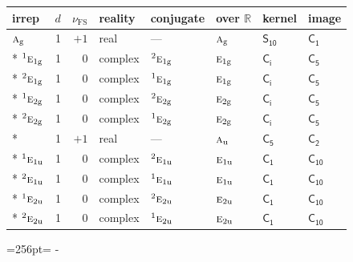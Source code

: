 \documentclass[10pt,a4paper]{article}
\newcommand{\needspace}[1]{\par\penalty-100\begingroup\dimen0=#1\relax\dimen2=\pagegoal
  \advance\dimen2-\pagetotal\ifdim\dimen0>\dimen2\relax\ifdim\dimen2>0pt\vfil\break\fi\fi
  \endgroup}
\numberwithin{equation}{section}
\newcommand{\grp}[1]{\mathsf{#1}}
\newcommand{\irr}[1]{\text{\normalfont\scshape #1}}
\newcommand{\conjpair}[1]{{}^{#1}}
\newcommand{\detbox}[1]{{\setlength{\fboxsep}{1pt}\fbox{#1}}}
\newcommand{\ptag}[1]{\mathrm{#1}}
\newcommand{\fsind}{\nu_{\mathrm{FS}}}
\begin{document}
{\small\renewcommand{\arraystretch}{1.25}\setlength{\tabcolsep}{4pt}\begin{longtable}{@{}lrrlllll@{}}\toprule
irrep & $d$ & $\fsind$ & reality & conjugate & over $\mathbb{R}$ & kernel & image\\\midrule\endhead
\bottomrule\endfoot\endlastfoot
$\irr{a}_{\ptag{g}}$ & 1 & $+1$ & real & --- & $\irr{a}_{\ptag{g}}$ & \href{S10.pdf}{$\grp{S_{10}}$} & \href{../../../rotation/data/pdf/C1.pdf}{$\grp{C_{1}}$}\\*
$\conjpair{1}\irr{e}_{1\ptag{g}}$ & 1 & $0$ & complex & $\conjpair{2}\irr{e}_{1\ptag{g}}$ & $\irr{e}_{1\ptag{g}}$ & \href{S2.pdf}{$\grp{C_{i}}$} & \href{../../../rotation/data/pdf/C5.pdf}{$\grp{C_{5}}$}\\*
$\conjpair{2}\irr{e}_{1\ptag{g}}$ & 1 & $0$ & complex & $\conjpair{1}\irr{e}_{1\ptag{g}}$ & $\irr{e}_{1\ptag{g}}$ & \href{S2.pdf}{$\grp{C_{i}}$} & \href{../../../rotation/data/pdf/C5.pdf}{$\grp{C_{5}}$}\\*
$\conjpair{1}\irr{e}_{2\ptag{g}}$ & 1 & $0$ & complex & $\conjpair{2}\irr{e}_{2\ptag{g}}$ & $\irr{e}_{2\ptag{g}}$ & \href{S2.pdf}{$\grp{C_{i}}$} & \href{../../../rotation/data/pdf/C5.pdf}{$\grp{C_{5}}$}\\*
$\conjpair{2}\irr{e}_{2\ptag{g}}$ & 1 & $0$ & complex & $\conjpair{1}\irr{e}_{2\ptag{g}}$ & $\irr{e}_{2\ptag{g}}$ & \href{S2.pdf}{$\grp{C_{i}}$} & \href{../../../rotation/data/pdf/C5.pdf}{$\grp{C_{5}}$}\\*
\detbox{$\irr{a}_{\ptag{u}}$} & 1 & $+1$ & real & --- & $\irr{a}_{\ptag{u}}$ & \href{C5.pdf}{$\grp{C_{5}}$} & \href{../../../rotation/data/pdf/C2.pdf}{$\grp{C_{2}}$}\\*
$\conjpair{1}\irr{e}_{1\ptag{u}}$ & 1 & $0$ & complex & $\conjpair{2}\irr{e}_{1\ptag{u}}$ & $\irr{e}_{1\ptag{u}}$ & \href{C1.pdf}{$\grp{C_{1}}$} & \href{../../../rotation/data/pdf/C10.pdf}{$\grp{C_{10}}$}\\*
$\conjpair{2}\irr{e}_{1\ptag{u}}$ & 1 & $0$ & complex & $\conjpair{1}\irr{e}_{1\ptag{u}}$ & $\irr{e}_{1\ptag{u}}$ & \href{C1.pdf}{$\grp{C_{1}}$} & \href{../../../rotation/data/pdf/C10.pdf}{$\grp{C_{10}}$}\\*
$\conjpair{1}\irr{e}_{2\ptag{u}}$ & 1 & $0$ & complex & $\conjpair{2}\irr{e}_{2\ptag{u}}$ & $\irr{e}_{2\ptag{u}}$ & \href{C1.pdf}{$\grp{C_{1}}$} & \href{../../../rotation/data/pdf/C10.pdf}{$\grp{C_{10}}$}\\*
$\conjpair{2}\irr{e}_{2\ptag{u}}$ & 1 & $0$ & complex & $\conjpair{1}\irr{e}_{2\ptag{u}}$ & $\irr{e}_{2\ptag{u}}$ & \href{C1.pdf}{$\grp{C_{1}}$} & \href{../../../rotation/data/pdf/C10.pdf}{$\grp{C_{10}}$}\\
\bottomrule\end{longtable}}
\needspace{256pt}
\end{document}
